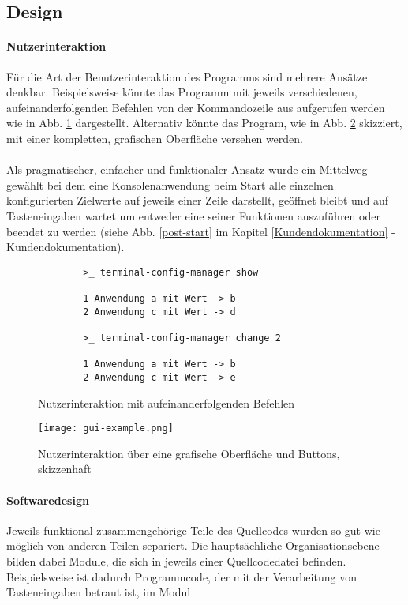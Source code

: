 \subsection{Design}
\paragraph{Nutzerinteraktion}
Für die Art der Benutzerinteraktion des Programms sind mehrere Ansätze denkbar.
Beispielsweise könnte das Programm mit jeweils verschiedenen, aufeinanderfolgenden
Befehlen von der Kommandozeile aus aufgerufen werden wie in Abb. \ref{simple-gui-example}
dargestellt. Alternativ könnte das Program, wie in Abb. \ref{graphical-gui-example} skizziert,
mit einer kompletten, grafischen Oberfläche versehen werden.

\paragraph{}
Als pragmatischer, einfacher und funktionaler Ansatz wurde ein Mittelweg gewählt
bei dem eine Konsolenanwendung beim Start alle einzelnen konfigurierten
Zielwerte auf jeweils einer Zeile darstellt, geöffnet bleibt und auf Tasteneingaben
wartet um entweder eine seiner Funktionen auszuführen oder beendet zu werden (siehe Abb. \ref{post-start}
im Kapitel \ref{Kundendokumentation} - Kundendokumentation).


\begin{figure}
    \caption{Nutzerinteraktion mit aufeinanderfolgenden Befehlen}
    \label{simple-gui-example}
    \begin{verbatim}
        >_ terminal-config-manager show
    
        1 Anwendung a mit Wert -> b
        2 Anwendung c mit Wert -> d
    
        >_ terminal-config-manager change 2
    
        1 Anwendung a mit Wert -> b
        2 Anwendung c mit Wert -> e
    \end{verbatim}
\end{figure}

\begin{figure}
    \caption{Nutzerinteraktion über eine grafische Oberfläche und Buttons, skizzenhaft}
    \label{graphical-gui-example}
    \centering\texttt{[image: gui-example.png]}
\end{figure}

\paragraph{Softwaredesign}
Jeweils funktional zusammengehörige Teile des Quellcodes wurden so gut wie möglich
von anderen Teilen separiert. Die hauptsächliche Organisationsebene bilden dabei
Module, die sich in jeweils einer Quellcodedatei befinden. Beispielsweise ist dadurch
Programmcode, der mit der Verarbeitung von Tasteneingaben betraut ist, im Modul

